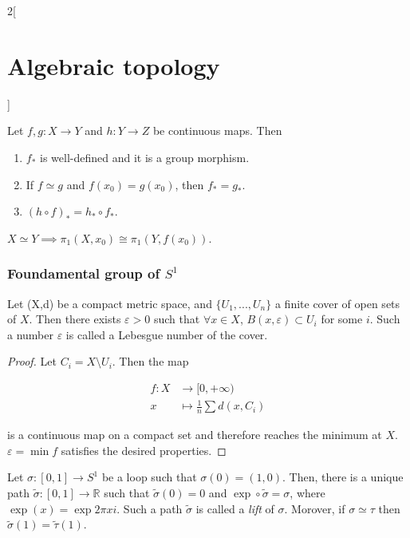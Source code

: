 \documentclass[../../../main.tex]{subfiles}
\begin{document}
\begin{multicols}{2}[\section{Algebraic topology}]
\begin{definition}
	\end{definition}

	\begin{proposition}
		Let $f,g:X\to Y$ and $h:Y \to Z $ be continuous maps. Then
		\begin{enumerate}
			\item $f_*$ is well-defined and it is a group morphism.
			\item If $f\simeq g$ and $f(x_0)=g(x_0)$, then $f_*=g_*$.
			\item $(h\circ f)_*=h_*\circ f_*$.
		\end{enumerate}
	\end{proposition}

	\begin{corollary}
		$X\simeq Y \implies \pi_1 (X,x_0) \cong \pi_1 (Y,f(x_0))$.
	\end{corollary}



	\subsubsection{Foundamental group of $S^1$}
	
	\begin{lemma}
		Let (X,d) be a compact metric space, and $\{U_1, ..., U_n\}$ a finite cover of open sets of $X$. Then there exists $\varepsilon>0$ such that $\forall x \in X$, $B(x,\varepsilon)\subset U_i$ for some $i$. Such a number $\varepsilon$ is called a Lebesgue number of the cover.
	\end{lemma}

	\begin{proof}
		Let $C_i=X\setminus U_i$.  Then the map 
		
		\begin{align*}			
			f:X &\longrightarrow [0, +\infty) \\
			x &\longmapsto \frac{1}{n} \sum d(x,C_i)			
		\end{align*}
		
		is a continuous map on a compact set and therefore reaches the minimum at $X$. $\varepsilon=\min f$ satisfies the desired properties.
	\end{proof}
	
	\begin{lemma}
		Let $\sigma: [0,1] \to S^1$ be a loop such that $\sigma(0)=(1,0)$. Then, there is a unique path $\tilde{\sigma}: [0,1] \to \mathbb{R}$ such that $\tilde{\sigma}(0)=0$ and $\operatorname{exp}\circ\tilde{\sigma}=\sigma$, where $\operatorname{exp}(x)=\exp{2\pi x i}$. Such a path $\tilde{\sigma}$ is called a \emph{lift} of $\sigma$. Morover, if $\sigma \simeq \tau$ then $\tilde{\sigma}(1)=\tilde{\tau}(1)$.
	\end{lemma}


\end{multicols}
\end{document}
